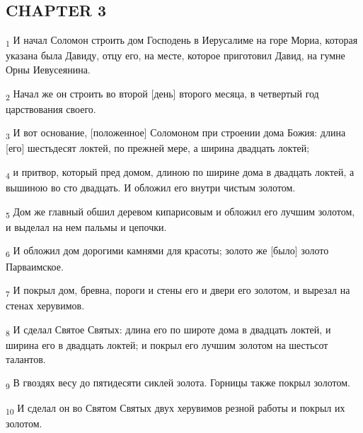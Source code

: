\subsection{CHAPTER 3}
\begin{tcolorbox}
\textsubscript{1} И начал Соломон строить дом Господень в Иерусалиме на горе Мориа, которая указана была Давиду, отцу его, на месте, которое приготовил Давид, на гумне Орны Иевусеянина.
\end{tcolorbox}
\begin{tcolorbox}
\textsubscript{2} Начал же он строить во второй [день] второго месяца, в четвертый год царствования своего.
\end{tcolorbox}
\begin{tcolorbox}
\textsubscript{3} И вот основание, [положенное] Соломоном при строении дома Божия: длина [его] шестьдесят локтей, по прежней мере, а ширина двадцать локтей;
\end{tcolorbox}
\begin{tcolorbox}
\textsubscript{4} и притвор, который пред домом, длиною по ширине дома в двадцать локтей, а вышиною во сто двадцать. И обложил его внутри чистым золотом.
\end{tcolorbox}
\begin{tcolorbox}
\textsubscript{5} Дом же главный обшил деревом кипарисовым и обложил его лучшим золотом, и выделал на нем пальмы и цепочки.
\end{tcolorbox}
\begin{tcolorbox}
\textsubscript{6} И обложил дом дорогими камнями для красоты; золото же [было] золото Парваимское.
\end{tcolorbox}
\begin{tcolorbox}
\textsubscript{7} И покрыл дом, бревна, пороги и стены его и двери его золотом, и вырезал на стенах херувимов.
\end{tcolorbox}
\begin{tcolorbox}
\textsubscript{8} И сделал Святое Святых: длина его по широте дома в двадцать локтей, и ширина его в двадцать локтей; и покрыл его лучшим золотом на шестьсот талантов.
\end{tcolorbox}
\begin{tcolorbox}
\textsubscript{9} В гвоздях весу до пятидесяти сиклей золота. Горницы также покрыл золотом.
\end{tcolorbox}
\begin{tcolorbox}
\textsubscript{10} И сделал он во Святом Святых двух херувимов резной работы и покрыл их золотом.
\end{tcolorbox}
